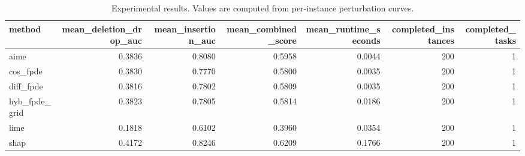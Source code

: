 \begin{table}[t]
\caption{Experimental results. Values are computed from per-instance perturbation curves.}
\label{tab:main_results_computed}
\centering
\begin{tabular}{lrrrrrr}
\toprule
method & mean\_deletion\_drop\_auc & mean\_insertion\_auc & mean\_combined\_score & mean\_runtime\_seconds & completed\_instances & completed\_tasks \\
\midrule
aime & 0.3836 & 0.8080 & 0.5958 & 0.0044 & 200 & 1 \\
cos\_fpde & 0.3830 & 0.7770 & 0.5800 & 0.0035 & 200 & 1 \\
diff\_fpde & 0.3816 & 0.7802 & 0.5809 & 0.0035 & 200 & 1 \\
hyb\_fpde\_grid & 0.3823 & 0.7805 & 0.5814 & 0.0186 & 200 & 1 \\
lime & 0.1818 & 0.6102 & 0.3960 & 0.0354 & 200 & 1 \\
shap & 0.4172 & 0.8246 & 0.6209 & 0.1766 & 200 & 1 \\
\bottomrule
\end{tabular}

\end{table}
